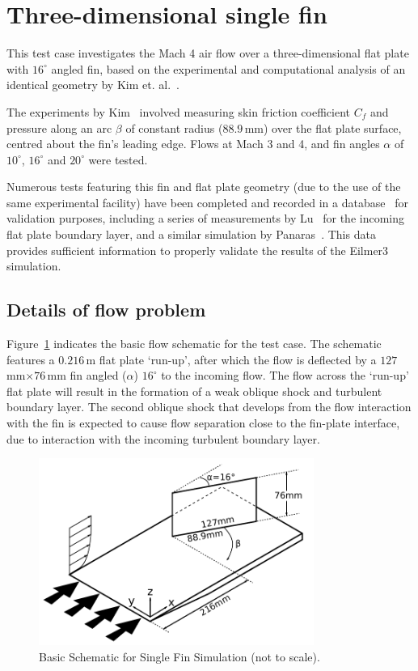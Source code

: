 \newpage
\section{Three-dimensional single fin}
\label{chapter-3Dsinglefin}
%
This test case investigates the Mach 4 air flow over a three-dimensional flat plate with $16^{\circ}$ angled fin, based on the experimental and computational analysis of an identical geometry by Kim et. al.~\cite{kim1991}. 

The experiments by Kim~\cite{kim1991} involved measuring skin friction coefficient $C_f$ and pressure along an arc $\beta$ of constant radius ($88.9$\,mm) over the flat plate surface, centred about the fin's leading edge. Flows at Mach 3 and 4, and fin angles $\alpha$ of $10^{\circ}$, $16^{\circ}$ and $20^{\circ}$ were tested.

Numerous tests featuring this fin and flat plate geometry (due to the use of the same experimental facility) have been completed and recorded in a database~\cite{settles1991} for validation purposes, including a series of measurements by Lu~\cite{lu1988} for the incoming flat plate boundary layer, and a similar simulation by Panaras~\cite{panaras97}. This data provides sufficient information to properly validate the results of the Eilmer3 simulation.
 
\subsection{Details of flow problem}
Figure~\ref{f:tc2:scheme} indicates the basic flow schematic for the test case. 
The schematic features a $0.216$\,m flat plate `run-up', after which the flow is deflected by a $127$\,mm$\times76$\,mm fin angled ($\alpha$) $16^{\circ}$ to the incoming flow. The flow across the `run-up' flat plate will result in the formation of a weak oblique shock and turbulent boundary layer. The second oblique shock that develops from the flow interaction with the fin is expected to cause flow separation close to the fin-plate interface, due to interaction with the incoming turbulent boundary layer.
%
\begin{figure}[htbp]
 \begin{center}
  \includegraphics[width=9cm]{./chap7-3Dsinglefin/figs/schematic2annotated2.pdf}
  \caption{Basic Schematic for Single Fin Simulation (not to scale).}
  \label{f:tc2:scheme}
 \end{center}
\end{figure}
%

